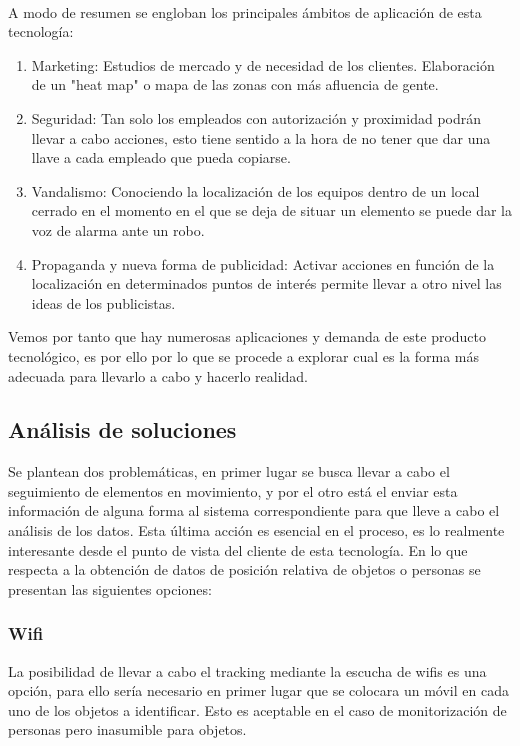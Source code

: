 \documentclass[a4paper ,12pt, onecolumn]{article}
\begin{document}
        \paragraph{}
        A modo de resumen se engloban los principales ámbitos de aplicación de esta tecnología:
        \begin{enumerate}
            \item Marketing: Estudios de mercado y de necesidad de los clientes. Elaboración de un "heat map" o mapa 
            de las zonas con más afluencia de gente.
            \item Seguridad: Tan solo los empleados con autorización y proximidad podrán llevar a cabo acciones, esto tiene 
            sentido a la hora de no tener que dar una llave a cada empleado que pueda copiarse.
            \item Vandalismo: Conociendo la localización de los equipos dentro de un local cerrado en el momento 
            en el que se deja de situar un elemento se puede dar la voz de alarma ante un robo.
            \item Propaganda y nueva forma de publicidad: Activar acciones en función de la localización en determinados
            puntos de interés permite llevar a otro nivel las ideas de los publicistas.
        \end{enumerate}
        Vemos por tanto que hay numerosas aplicaciones y demanda de este producto tecnológico, es por ello por lo que se 
        procede a explorar cual es la forma más adecuada para llevarlo a cabo y hacerlo realidad.
    \subsection{Análisis de soluciones}
        Se plantean dos problemáticas, en primer lugar se busca llevar a cabo el seguimiento de elementos en movimiento, y por el otro 
        está el enviar esta información de alguna forma al sistema correspondiente para que lleve a cabo el análisis de los datos. Esta
        última acción es esencial en el proceso, es lo realmente interesante desde el punto de vista del cliente de esta tecnología.
        En lo que respecta a la obtención de datos de posición relativa de objetos o personas se presentan las siguientes opciones:
        \subsubsection {Wifi}
            La posibilidad de llevar a cabo el tracking mediante la escucha de wifis es una opción, para ello sería
            necesario en primer lugar que se colocara un móvil en cada uno de los objetos a identificar. Esto es aceptable 
            en el caso de monitorización de personas pero inasumible para objetos.
\end{document}
